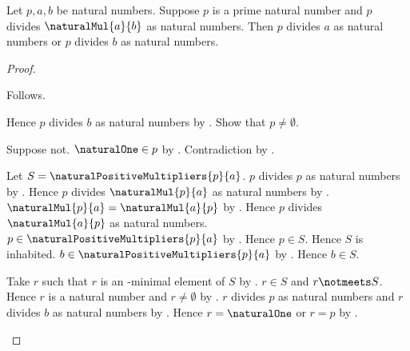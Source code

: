 \begin{theorem}\label{prime_divides_natural_product}
    Let $p,a,b$ be natural numbers.
    Suppose $p$ is a prime natural number and
        $p$ divides $\naturalMul{a}{b}$ as natural numbers.
    Then $p$ divides $a$ as natural numbers or
        $p$ divides $b$ as natural numbers.
\end{theorem}
\begin{proof}
    \begin{byCase}
            Follows.
            \begin{byCase}
                    Hence $p$ divides $b$ as natural numbers
                        by .
                    Show that $p\neq\emptyset$.
                    \begin{subproof}
                        Suppose not.
                        $\naturalOne\in p$
                            by .
                        Contradiction by .
                    \end{subproof}

                    Let $S=\naturalPositiveMultipliers{p}{a}$.
                    $p$ divides $p$ as natural numbers
                        by .
                    Hence $p$ divides $\naturalMul{p}{a}$
                        as natural numbers
                        by .
                    $\naturalMul{p}{a}=\naturalMul{a}{p}$
                        by .
                    Hence $p$ divides $\naturalMul{a}{p}$
                        as natural numbers.
                    $p\in\naturalPositiveMultipliers{p}{a}$ by
                        .
                    Hence $p\in S$.
                    Hence $S$ is inhabited.
                    $b\in\naturalPositiveMultipliers{p}{a}$ by
                        .
                    Hence $b\in S$.

                    Take $r$ such that $r$ is an \in-minimal element of $S$
                        by .
                    $r\in S$ and $r\notmeets S$.
                    Hence $r$ is a natural number and $r\neq\emptyset$
                        by .
                    $r$ divides $p$ as natural numbers and
                        $r$ divides $b$ as natural numbers
                        by .
                    Hence $r=\naturalOne$ or $r=p$
                        by .


\end{byCase}
\end{byCase}
\end{proof}
